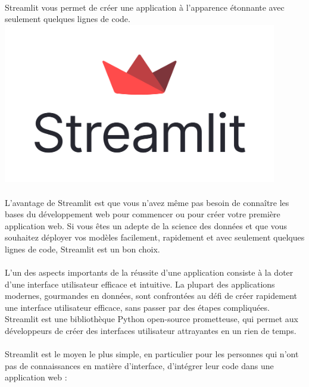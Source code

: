 \paragraph{}
Streamlit vous permet de créer une application à l'apparence étonnante avec seulement quelques lignes de code.
 \includegraphics[width=\linewidth, height=7cm]{images/streamlit-logo-secondary-colormark-darktext.png}

 \paragraph{}
 L'avantage de Streamlit est que vous n'avez même pas besoin de connaître les bases du développement web pour commencer ou pour créer votre première application web. Si vous êtes un adepte de la science des données et que vous souhaitez déployer vos modèles facilement, rapidement et avec seulement quelques lignes de code, Streamlit est un bon choix.

 \paragraph{}
L'un des aspects importants de la réussite d'une application consiste à la doter d'une interface utilisateur efficace et intuitive. La plupart des applications modernes, gourmandes en données, sont confrontées au défi de créer rapidement une interface utilisateur efficace, sans passer par des étapes compliquées. Streamlit est une bibliothèque Python open-source prometteuse, qui permet aux développeurs de créer des interfaces utilisateur attrayantes en un rien de temps.

\paragraph{}
Streamlit est le moyen le plus simple, en particulier pour les personnes qui n'ont pas de connaissances en matière d'interface, d'intégrer leur code dans une application web :


